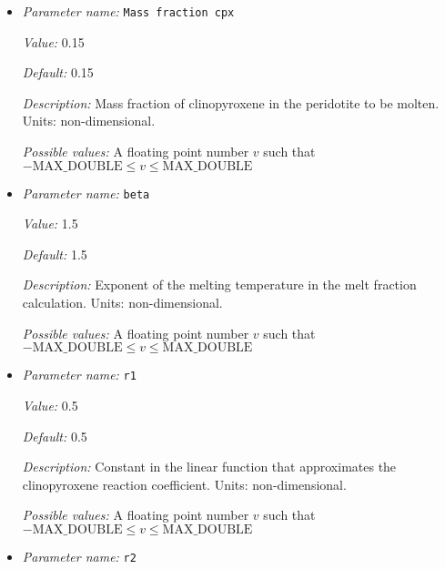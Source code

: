 \begin{itemize}
{\it Default:} -611.4


{\it Description:} Prefactor of the quadratic depletion term in the quadratic function that approximates the melt fraction of pyroxenite. Units: $°C/(Pa^2)$.


{\it Possible values:} A floating point number $v$ such that $-\text{MAX\_DOUBLE} \leq v \leq \text{MAX\_DOUBLE}$
\item {\it Parameter name:} {\tt Mass fraction cpx}
\label{parameters:Postprocess/Visualization/Melt fraction/Mass fraction cpx}
\label{parameters:Postprocess/Visualization/Melt_20fraction/Mass_20fraction_20cpx}


{\it Value:} 0.15


{\it Default:} 0.15


{\it Description:} Mass fraction of clinopyroxene in the peridotite to be molten. Units: non-dimensional.


{\it Possible values:} A floating point number $v$ such that $-\text{MAX\_DOUBLE} \leq v \leq \text{MAX\_DOUBLE}$
\item {\it Parameter name:} {\tt beta}
\label{parameters:Postprocess/Visualization/Melt fraction/beta}
\label{parameters:Postprocess/Visualization/Melt_20fraction/beta}


{\it Value:} 1.5


{\it Default:} 1.5


{\it Description:} Exponent of the melting temperature in the melt fraction calculation. Units: non-dimensional.


{\it Possible values:} A floating point number $v$ such that $-\text{MAX\_DOUBLE} \leq v \leq \text{MAX\_DOUBLE}$
\item {\it Parameter name:} {\tt r1}
\label{parameters:Postprocess/Visualization/Melt fraction/r1}
\label{parameters:Postprocess/Visualization/Melt_20fraction/r1}


{\it Value:} 0.5


{\it Default:} 0.5


{\it Description:} Constant in the linear function that approximates the clinopyroxene reaction coefficient. Units: non-dimensional.


{\it Possible values:} A floating point number $v$ such that $-\text{MAX\_DOUBLE} \leq v \leq \text{MAX\_DOUBLE}$
\item {\it Parameter name:} {\tt r2}
\label{parameters:Postprocess/Visualization/Melt fraction/r2}
\label{parameters:Postprocess/Visualization/Melt_20fraction/r2}



\end{itemize}
